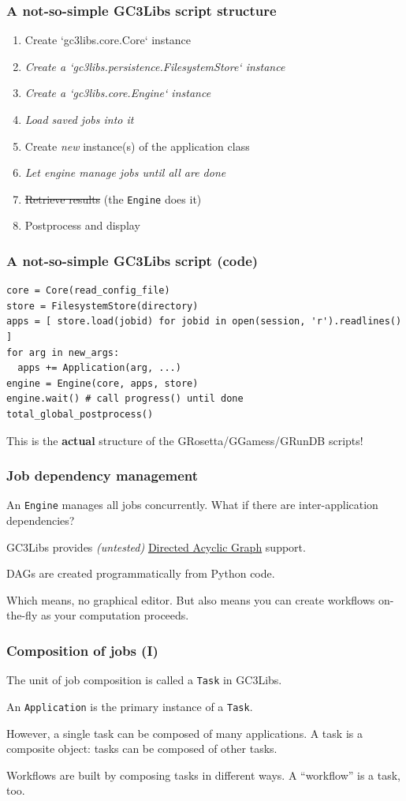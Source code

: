 \documentclass[presentation]{beamer}
\begin{document}
\begin{frame}
\frametitle{A not-so-simple GC3Libs script structure}
\label{sec-22}

\begin{enumerate}
\item Create `gc3libs.core.Core` instance
\item \emph{Create a `gc3libs.persistence.FilesystemStore` instance}
\item \emph{Create a `gc3libs.core.Engine` instance}
\item \emph{Load saved jobs into it}
\item Create \emph{new} instance(s) of the application class
\item \emph{Let engine manage jobs until all are done}
\item \st{Retrieve results} (the \texttt{Engine} does it)
\item Postprocess and display
\end{enumerate}
\end{frame}
\begin{frame}[fragile]
\frametitle{A not-so-simple GC3Libs script (code)}
\label{sec-23}

\begin{verbatim}
core = Core(read_config_file)
store = FilesystemStore(directory)
apps = [ store.load(jobid) for jobid in open(session, 'r').readlines() ]
for arg in new_args:
  apps += Application(arg, ...)
engine = Engine(core, apps, store)
engine.wait() # call progress() until done
total_global_postprocess()
\end{verbatim}

  This is the \textbf{actual} structure of the GRosetta/GGamess/GRunDB
  scripts! 
\end{frame}
\begin{frame}
\frametitle{Job dependency management}
\label{sec-24}

  An \texttt{Engine} manages all jobs concurrently.
  What if there are inter-application dependencies?

  GC3Libs provides \emph{(untested)} \href{http://en.wikipedia.org/wiki/Directed_acyclic_graph}{Directed Acyclic Graph} support.

  DAGs are created programmatically from Python code.

  Which means, no graphical editor.  But also means you can create
  workflows on-the-fly as your computation proceeds.
\end{frame}
\begin{frame}
\frametitle{Composition of jobs (I)}
\label{sec-25}

  The unit of job composition is called a \texttt{Task} in GC3Libs.

  An \texttt{Application} is the primary instance of a \texttt{Task}.

  However, a single task can be composed of many applications.
  A task is a composite object: tasks can be composed of other tasks.

  Workflows are built by composing tasks in different ways.
  A ``workflow'' is a task, too.
\end{frame}
\end{document}
